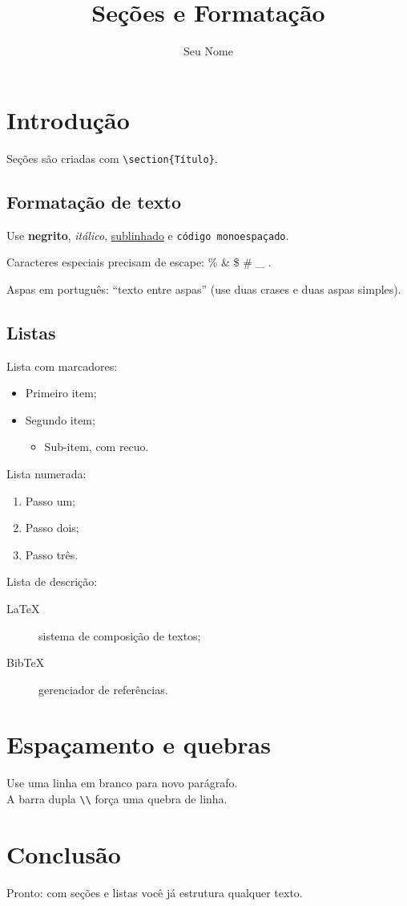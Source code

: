 \documentclass[12pt, a4paper]{article}
\title{Seções e Formatação}
\author{Seu Nome}
\date{}
\begin{document}
\maketitle

\section{Introdução}
Seções são criadas com \texttt{\textbackslash section\{Título\}}.

\subsection{Formatação de texto}
Use \textbf{negrito}, \textit{itálico}, \underline{sublinhado} e \texttt{código monoespaçado}.

Caracteres especiais precisam de escape: \% \& \$ \# \_ .

Aspas em português: ``texto entre aspas'' (use duas crases e duas aspas simples).

\subsection{Listas}

Lista com marcadores:
\begin{itemize}
    \item Primeiro item;
    \item Segundo item;
    \begin{itemize}
        \item Sub-item, com recuo.
    \end{itemize}
\end{itemize}

Lista numerada:
\begin{enumerate}
    \item Passo um;
    \item Passo dois;
    \item Passo três.
\end{enumerate}

Lista de descrição:
\begin{description}
    \item[LaTeX] sistema de composição de textos;
    \item[BibTeX] gerenciador de referências.
\end{description}

\section{Espaçamento e quebras}
Use uma linha em branco para novo parágrafo.\\
A barra dupla \texttt{\textbackslash\textbackslash} força uma quebra de linha.

\section{Conclusão}
Pronto: com seções e listas você já estrutura qualquer texto.
\end{document}
